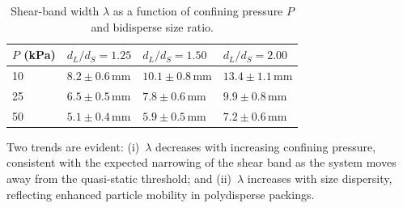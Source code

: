 \begin{table}[htbp]
\centering
\caption{Shear-band width $\lambda$ as a function of confining pressure $P$ and bidisperse size ratio.}
\label{tab:shear_band}
\begin{tabularx}{0.78\textwidth}{lXXX}
\toprule
$P$ (kPa) & $d_L/d_S = 1.25$ & $d_L/d_S = 1.50$ & $d_L/d_S = 2.00$ \\
\midrule
10  & $8.2 \pm 0.6$\,mm & $10.1 \pm 0.8$\,mm & $13.4 \pm 1.1$\,mm \\
25  & $6.5 \pm 0.5$\,mm & $7.8 \pm 0.6$\,mm  & $9.9 \pm 0.8$\,mm  \\
50  & $5.1 \pm 0.4$\,mm & $5.9 \pm 0.5$\,mm  & $7.2 \pm 0.6$\,mm  \\
\bottomrule
\end{tabularx}
\end{table}

Two trends are evident: (i)~$\lambda$ decreases with increasing confining pressure, consistent with the expected narrowing of the shear band as the system moves away from the quasi-static threshold; and (ii)~$\lambda$ increases with size dispersity, reflecting enhanced particle mobility in polydisperse packings.
